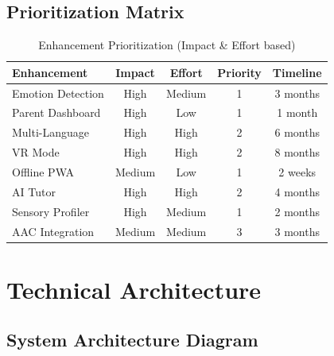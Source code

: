 \documentclass[12pt, a4paper]{article}
\begin{document}
\subsection{Prioritization Matrix}

\begin{table}[H]
\centering
\begin{tabular}{|l|c|c|c|c|}
\hline
\rowcolor{stargold!30}
\textbf{Enhancement} & \textbf{Impact} & \textbf{Effort} & \textbf{Priority} & \textbf{Timeline} \\
\hline
Emotion Detection & High & Medium & 1 & 3 months \\
\hline
Parent Dashboard & High & Low & 1 & 1 month \\
\hline
Multi-Language & High & High & 2 & 6 months \\
\hline
VR Mode & High & High & 2 & 8 months \\
\hline
Offline PWA & Medium & Low & 1 & 2 weeks \\
\hline
AI Tutor & High & High & 2 & 4 months \\
\hline
Sensory Profiler & High & Medium & 1 & 2 months \\
\hline
AAC Integration & Medium & Medium & 3 & 3 months \\
\hline
\end{tabular}
\caption{Enhancement Prioritization (Impact \& Effort based)}
\end{table}

\section{Technical Architecture}

\subsection{System Architecture Diagram}
\end{document}

